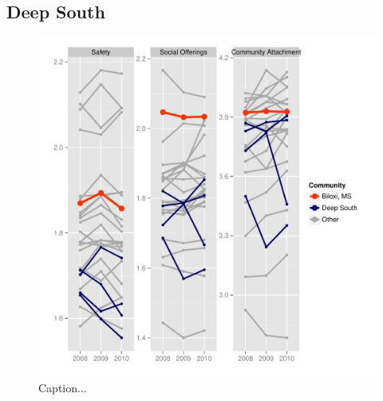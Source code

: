 \documentclass[11pt]{article}\usepackage{knitr}
\begin{document}
\subsection*{Deep South}
\begin{knitrout}
\color{fgcolor}\begin{figure}[H]

\includegraphics[width=\maxwidth]{figure/ds_one} \caption[Caption]{Caption...\label{fig:ds_one}}
\end{figure}


\end{knitrout}
\end{document}
